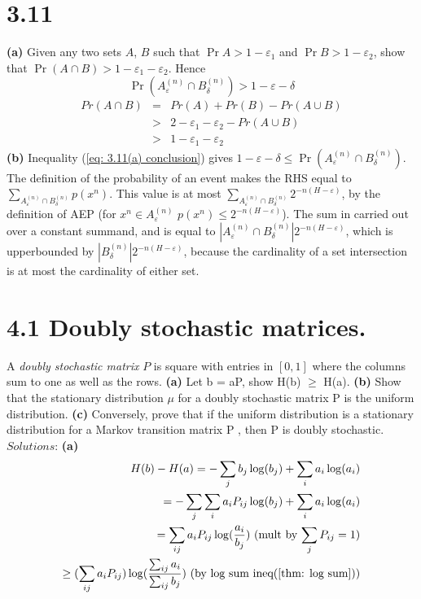 \documentclass[10pt]{article}
\newcommand{\pref}[1]{{(\ref{#1})}}
\begin{document}
\begin{tiny}
\begin{multicols}{3}
\section*{3.11}
\textbf{(a)}
Given any two sets $A$, $B$ such that $\Pr{A} > 1-\varepsilon_1$ and
$\Pr{B} > 1-\varepsilon_2$, show that $\Pr(A\cap B) > 1 - \varepsilon_1 -
\varepsilon_2$. Hence
\begin{equation}
    \Pr(A_\varepsilon^{(n)} \cap B_\delta^{(n)}) > 1 - \varepsilon - \delta
    \label{eq: 3.11(a) conclusion}
\end{equation}
\proof
\begin{eqnarray}
    Pr(A\cap B) &=& Pr(A) + Pr(B) - Pr(A\cup B)
    \label{eq: pr A intersect B} \\
    &>& 2 - \varepsilon_1 - \varepsilon_2 - Pr(A\cup B)
    \label{eq: sub hypotheses} \\
    &>& 1 - \varepsilon_1 - \varepsilon_2
    \label{eq: 3.11a}
\end{eqnarray}
\textbf{(b)} 
Inequality \pref{eq: 3.11(a) conclusion} gives $1-\varepsilon-\delta \leq \Pr(A_\varepsilon^{(n)} \cap B_\delta^{(n)})$. 
The definition of the probability of an event makes the RHS equal to
$\sum_{A_\varepsilon^{(n)} \cap B_\delta^{(n)}} p(x^n)$.
This value is at most 
$\sum_{A_\varepsilon^{(n)} \cap B_\delta^{(n)}} 2^{-n(H-\varepsilon)}$, 
by the definition of AEP 
(for $x^n \in A_\varepsilon^{(n)}$ $p(x^n) \leq 2^{-n(H - \varepsilon)}$).
The sum in carried out over a constant summand, and is equal to
$|A_\varepsilon^{(n)} \cap B_\delta^{(n)}|2^{-n(H-\varepsilon)}$, which is
upperbounded by $|B_\delta^{(n)}|2^{-n(H-\varepsilon)}$, because the
cardinality of a set intersection is at most the cardinality of either
set.


\section*{4.1 Doubly stochastic matrices.} %
A \emph{doubly stochastic matrix} $P$ is square with entries in $[0,1]$ where the columns sum to one as well as the rows. 
\textbf{(a)}  Let b = aP, show H(b) $\ge$ H(a). 
\textbf{(b)} Show that the stationary distribution $\mu$ for a doubly stochastic matrix P is the uniform distribution. 
\textbf{(c)} Conversely, prove that if the uniform distribution is a stationary distribution for a Markov transition matrix P , then P is doubly stochastic.
$Solutions$:
\textbf{(a)}
\begin{eqnarray*}
H(b) - H(a) 
= -\sum_j b_j \log (b_j) + \sum_i a_i \log (a_i) \\
= - \sum_j \sum_i a_iP_{ij} \log(b_j)+\sum_i a_i \log (a_i) \\
= \sum_{ij}a_iP_{ij} \log(\frac{ a_i }{ b_j }) 
\text{ (mult by $\sum_j P_{ij} = 1$)} \\
\ge (\sum_{ij}a_iP_{ij}) \log(\frac{\sum_{ij} a_i }{\sum_{ij} b_j })
\text{ (by log sum ineq\pref{thm: log sum})} \\
\end{eqnarray*}


\end{multicols}
\end{tiny}
\end{document}
